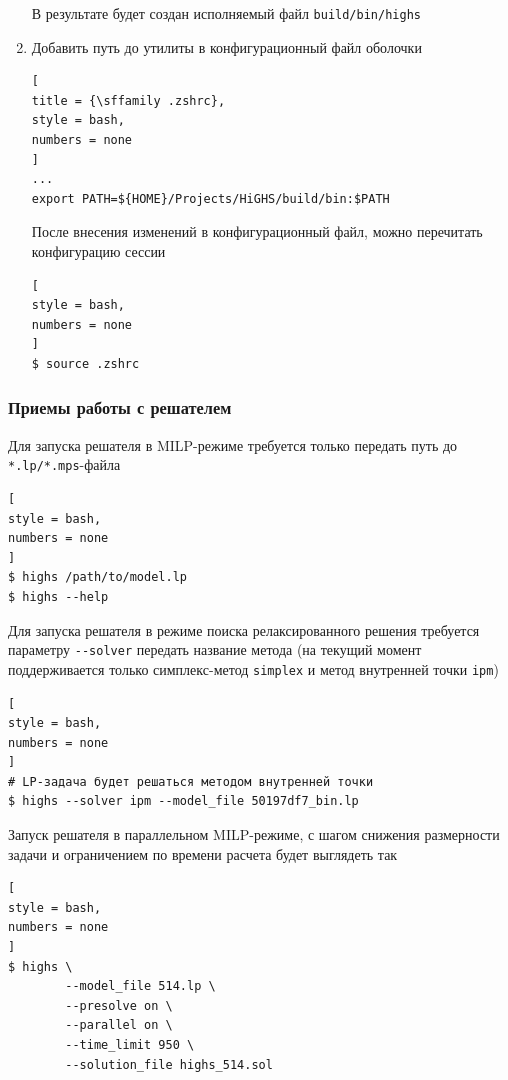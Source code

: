 \documentclass[%
	11pt,
	a4paper,
	utf8,
		]{article}
\begin{document}
\begin{enumerate}
В результате будет создан исполняемый файл \texttt{build/bin/highs}
    
    \item Добавить путь до утилиты в конфигурационный файл оболочки
\begin{lstlisting}[
title = {\sffamily .zshrc},
style = bash,
numbers = none
]
...
export PATH=${HOME}/Projects/HiGHS/build/bin:$PATH
\end{lstlisting}

После внесения изменений в конфигурационный файл, можно перечитать конфигурацию сессии
\begin{lstlisting}[
style = bash,
numbers = none
]
$ source .zshrc
\end{lstlisting}
\end{enumerate}
\vspace*{3mm}

\subsubsection{Приемы работы с решателем}

Для запуска решателя в MILP-режиме требуется только передать путь до \texttt{*.lp/*.mps}-файла
\begin{lstlisting}[
style = bash,
numbers = none
]
$ highs /path/to/model.lp
$ highs --help
\end{lstlisting}

Для запуска решателя в режиме поиска релаксированного решения требуется параметру \verb|--solver| передать название метода (на текущий момент поддерживается только симплекс-метод \texttt{simplex} и метод внутренней точки \texttt{ipm})
\begin{lstlisting}[
style = bash,
numbers = none
]
# LP-задача будет решаться методом внутренней точки
$ highs --solver ipm --model_file 50197df7_bin.lp
\end{lstlisting} 

Запуск решателя в параллельном MILP-режиме, с шагом снижения размерности задачи и ограничением по времени расчета будет выглядеть так
\begin{lstlisting}[
style = bash,
numbers = none
]
$ highs \
        --model_file 514.lp \
        --presolve on \
        --parallel on \
        --time_limit 950 \ 
        --solution_file highs_514.sol
\end{lstlisting}
\end{document}
